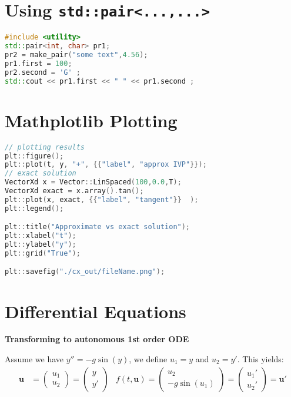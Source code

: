 \documentclass{sciposter}
\renewcommand{\vec}[1]{\mathbf{#1}}
\newcommand{\psection}[1]{\par \textbf{\large#1}}
\begin{document}
\begin{multicols}{2}
\section*{Using \texttt{std::pair<...,...>}}
\begin{lstlisting}[language=c++]
#include <utility>
std::pair<int, char> pr1; 
pr2 = make_pair("some text",4.56); 
pr1.first = 100; 
pr2.second = 'G' ; 
std::cout << pr1.first << " " << pr1.second ; 
\end{lstlisting}





\section*{Mathplotlib Plotting}

\begin{lstlisting}[language=c++]
// plotting results
plt::figure();
plt::plot(t, y, "+", {{"label", "approx IVP"}});
// exact solution 
VectorXd x = Vector::LinSpaced(100,0.0,T);
VectorXd exact = x.array().tan();
plt::plot(x, exact, {{"label", "tangent"}}  );
plt::legend();

plt::title("Approximate vs exact solution");
plt::xlabel("t");
plt::ylabel("y");
plt::grid("True");

plt::savefig("./cx_out/fileName.png");
\end{lstlisting}

\section*{Differential Equations}

\psection{Transforming to autonomous 1st order ODE}

Assume we have $y'' = -g\sin(y)$, we define $u_1 = y$ and $u_2 = y'$. This yields:
\begin{align*}
	\vec{u} &= \begin{pmatrix}
	u_1 \\ u_2
	\end{pmatrix} = \begin{pmatrix}
	y \\ y'
	\end{pmatrix} & f(t,\vec{u}) = \begin{pmatrix}
	u_2 \\ -g\sin(u_1)
	\end{pmatrix} = \begin{pmatrix}
	u_1 '\\ u_2 '
	\end{pmatrix} = \vec{u}'
\end{align*}



\end{multicols}
\end{document}
